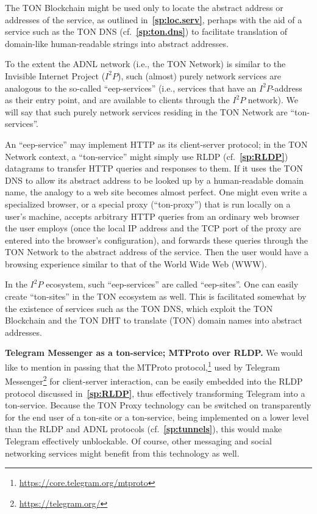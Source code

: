 \documentclass[12pt,oneside]{article}
\def\makepoint#1{\medbreak\noindent{\bf #1.\ }}
\def\nxsubpoint{\refstepcounter{subsubsection}%
  \smallbreak\makepoint{\thesubsubsection}}
\def\refpoint#1{{\rm\textbf{\ref{#1}}}}
\let\ptref=\refpoint
\def\embt(#1.){\textbf{#1.}}
\begin{document}
The TON Blockchain might be used only to locate the abstract address
or addresses of the service, as outlined in~\ptref{sp:loc.serv},
perhaps with the aid of a service such as the TON DNS
(cf.~\ptref{sp:ton.dns}) to facilitate translation of domain-like
human-readable strings into abstract addresses.

To the extent the ADNL network (i.e., the TON Network) is similar to
the Invisible Internet Project ($I^2P$), such (almost) purely network
services are analogous to the so-called ``eep-services'' (i.e.,
services that have an $I^2P$-address as their entry point, and are
available to clients through the $I^2P$ network). We will say that
such purely network services residing in the TON Network are
``ton-services''.

An ``eep-service'' may implement HTTP as its client-server protocol;
in the TON Network context, a ``ton-service'' might simply use RLDP
(cf.~\ptref{sp:RLDP}) datagrams to transfer HTTP queries and responses
to them. If it uses the TON DNS to allow its abstract address to be
looked up by a human-readable domain name, the analogy to a web site
becomes almost perfect. One might even write a specialized browser, or
a special proxy (``ton-proxy'') that is run locally on a user's
machine, accepts arbitrary HTTP queries from an ordinary web browser
the user employs (once the local IP address and the TCP port of the
proxy are entered into the browser's configuration), and forwards
these queries through the TON Network to the abstract address of the
service. Then the user would have a browsing experience similar to
that of the World Wide Web (WWW).

In the $I^2P$ ecosystem, such ``eep-services'' are called
``eep-sites''. One can easily create ``ton-sites'' in the TON
ecosystem as well. This is facilitated somewhat by the existence of
services such as the TON DNS, which exploit the TON Blockchain and the
TON DHT to translate (TON) domain names into abstract addresses.

\nxsubpoint\label{sp:telegram.ton.serv} \embt(Telegram Messenger as a
ton-service; MTProto over RLDP.)  We would like to mention in passing
that the MTProto
protocol,\footnote{\url{https://core.telegram.org/mtproto}} used by
Telegram Messenger\footnote{\url{https://telegram.org/}} for
client-server interaction, can be easily embedded into the RLDP
protocol discussed in~\ptref{sp:RLDP}, thus effectively transforming
Telegram into a ton-service. Because the TON Proxy technology can be
switched on transparently for the end user of a ton-site or a
ton-service, being implemented on a lower level than the RLDP and ADNL
protocols (cf.~\ptref{sp:tunnels}), this would make Telegram
effectively unblockable. Of course, other messaging and social
networking services might benefit from this technology as well.
\end{document}

